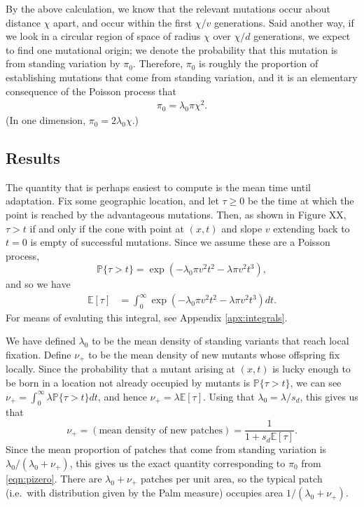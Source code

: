 \documentclass{article}
\renewcommand{\P}{\mathbb{P}}
\newcommand{\E}{\mathbb{E}}
\begin{document}
By the above calculation, we know that the relevant mutations occur about distance $\chi$ apart, 
and occur within the first $\chi/v$ generations.
Said another way, if we look in a circular region of space of radius $\chi$ over $\chi/d$ generations,
we expect to find one mutational origin;
we denote the probability that this mutation is from standing variation by $\pi_0$.
Therefore, $\pi_0$ is roughly the proportion of establishing mutations that come from standing variation,
and it is an elementary consequence of the Poisson process that
\begin{align} \label{eqn:pizero}
    \pi_0 = \lambda_0 \pi \chi^2 .
\end{align}
(In one dimension, $\pi_0 = 2 \lambda_0 \chi$.)

\subsection{Results} 

The quantity that is perhaps easiest to compute is the mean time until adaptation.
Fix some geographic location, and let $\tau\ge0$ be the time at which the point is reached by the advantageous mutations.
Then, as shown in Figure XX,
$\tau > t$ if and only if the cone with point at $(x,t)$ and slope $v$ extending back to $t=0$ is empty of successful mutations.
Since we assume these are a Poisson process, 
\[
    \P\{ \tau > t \} = \exp\left( - \lambda_0 \pi v^2 t^2 - \lambda \pi v^2 t^3 \right) ,
\]
and so we have
\begin{align}
    \E[\tau] %
        &= \int_0^\infty \exp\left( - \lambda_0 \pi v^2 t^2 - \lambda \pi v^2 t^3 \right) dt.
\end{align}
For means of evaluting this integral, see Appendix \ref{apx:integrals}.


We have defined $\lambda_0$ to be the mean density of standing variants that reach local fixation.
Define $\nu_+$ to be the mean density of new mutants whose offspring fix locally.
Since the probability that a mutant arising at $(x,t)$ is lucky enough to be born in a location not already occupied by mutants
is $\P\{ \tau > t \}$,
we can see  $\nu_+ = \int_0^\infty \lambda \P\{\tau>t\} dt$, and hence
$\nu_+ = \lambda \E[\tau] $.
Using that $\lambda_0 = \lambda / s_d$, this gives us that
\begin{equation}
    \nu_+ = (\mbox{mean density of new patches}) = \frac{1}{1+s_d \E[\tau]} .
\end{equation}
Since the mean proportion of patches that come from standing variation is $\lambda_0 / (\lambda_0 + \nu_+)$,
this gives us the exact quantity corresponding to $\pi_0$ from \eqref{eqn:pizero}.
There are $\lambda_0 + \nu_+$ patches per unit area, so
the typical patch (i.e.\ with distribution given by the Palm measure) occupies area $1/(\lambda_0 + \nu_+)$.
\end{document}
